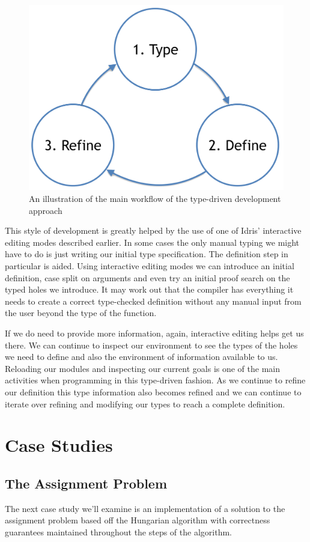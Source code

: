 \documentclass[a4paper, notitlepage]{report}
\begin{document}
\begin{figure}[H]
\centering
\includegraphics[width=0.8\linewidth]{./fig/tdd_cycle.png}
\caption{An illustration of the main workflow of the type-driven development approach}
\end{figure}

This style of development is greatly helped by the use of one of Idris'
interactive editing modes described earlier. In some cases the only manual
typing we might have to do is just writing our initial type specification. The
definition step in particular is aided. Using interactive editing modes we can
introduce an initial definition, case split on arguments and even try an initial
proof search on the typed holes we introduce. It may work out that the compiler
has everything it needs to create a correct type-checked definition without any
manual input from the user beyond the type of the function.

If we do need to provide more information, again, interactive editing helps get
us there. We can continue to inspect our environment to see the types of the
holes we need to define and also the environment of information available to us.
Reloading our modules and inspecting our current goals is one of the main
activities when programming in this type-driven fashion. As we continue to
refine our definition this type information also becomes refined and we can
continue to iterate over refining and modifying our types to reach a complete
definition.
\chapter{Case Studies}
\label{sec:org588b4e7}
\section{The Assignment Problem}
\label{sec:orgd38256e}
The next case study we'll examine is an implementation of a solution to the
assignment problem based off the Hungarian algorithm with correctness guarantees
maintained throughout the steps of the algorithm.
\end{document}
